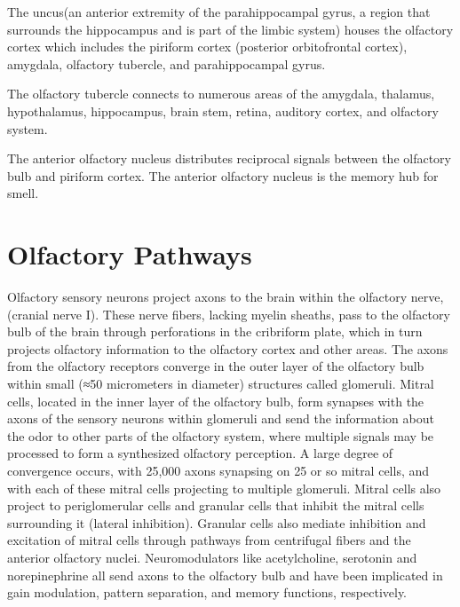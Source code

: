 \documentclass[]{book}
\begin{document}
The uncus(an anterior extremity of the parahippocampal gyrus, a region that surrounds the hippocampus and is part of the limbic system) houses the olfactory cortex which includes the piriform cortex (posterior orbitofrontal cortex), amygdala, olfactory tubercle, and parahippocampal gyrus.

The olfactory tubercle connects to numerous areas of the amygdala, thalamus, hypothalamus, hippocampus, brain stem, retina, auditory cortex, and olfactory system.

The anterior olfactory nucleus distributes reciprocal signals between the olfactory bulb and piriform cortex. The anterior olfactory nucleus is the memory hub for smell.

\hypertarget{olfactory-pathways}{%
\section{Olfactory Pathways}\label{olfactory-pathways}}

Olfactory sensory neurons project axons to the brain within the olfactory nerve, (cranial nerve I). These nerve fibers, lacking myelin sheaths, pass to the olfactory bulb of the brain through perforations in the cribriform plate, which in turn projects olfactory information to the olfactory cortex and other areas. The axons from the olfactory receptors converge in the outer layer of the olfactory bulb within small (≈50 micrometers in diameter) structures called glomeruli. Mitral cells, located in the inner layer of the olfactory bulb, form synapses with the axons of the sensory neurons within glomeruli and send the information about the odor to other parts of the olfactory system, where multiple signals may be processed to form a synthesized olfactory perception. A large degree of convergence occurs, with 25,000 axons synapsing on 25 or so mitral cells, and with each of these mitral cells projecting to multiple glomeruli. Mitral cells also project to periglomerular cells and granular cells that inhibit the mitral cells surrounding it (lateral inhibition). Granular cells also mediate inhibition and excitation of mitral cells through pathways from centrifugal fibers and the anterior olfactory nuclei. Neuromodulators like acetylcholine, serotonin and norepinephrine all send axons to the olfactory bulb and have been implicated in gain modulation, pattern separation, and memory functions, respectively.
\end{document}
